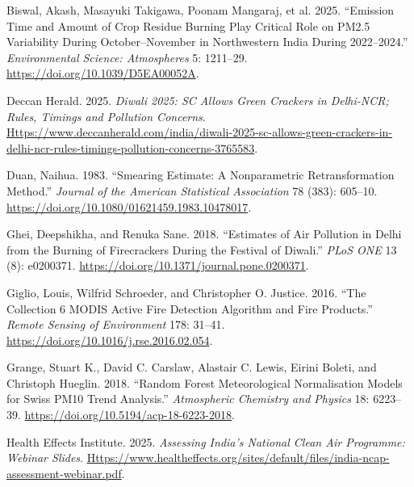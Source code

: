 \documentclass[
  11pt,
]{article}
\newlength{\cslhangindent}
\newenvironment{CSLReferences}[2] %
 {\begin{list}{}{%
  \setlength{\itemindent}{0pt}
  \setlength{\leftmargin}{0pt}
  \setlength{\parsep}{0pt}
  \ifodd #1
   \setlength{\leftmargin}{\cslhangindent}
   \setlength{\itemindent}{-1\cslhangindent}
  \fi
  \setlength{\itemsep}{#2\baselineskip}}}
 {\end{list}}
\begin{document}
\protect{}\label{refs}
\begin{CSLReferences}{1}{1}
Biswal, Akash, Masayuki Takigawa, Poonam Mangaraj, et al. 2025.
{``Emission Time and Amount of Crop Residue Burning Play Critical Role
on {PM2.5} Variability During {October--November} in Northwestern
{India} During 2022--2024.''} \emph{Environmental Science: Atmospheres}
5: 1211--29. \url{https://doi.org/10.1039/D5EA00052A}.

Deccan Herald. 2025. \emph{Diwali 2025: {SC} Allows Green Crackers in
{Delhi-NCR}; Rules, Timings and Pollution Concerns}.
\href{https://www.deccanherald.com/india/diwali-2025-sc-allows-green-crackers-in-delhi-ncr-rules-timings-pollution-concerns-3765583}{Https://www.deccanherald.com/india/diwali-2025-sc-allows-green-crackers-in-delhi-ncr-rules-timings-pollution-concerns-3765583}.

Duan, Naihua. 1983. {``Smearing Estimate: A Nonparametric
Retransformation Method.''} \emph{Journal of the American Statistical
Association} 78 (383): 605--10.
\url{https://doi.org/10.1080/01621459.1983.10478017}.

Ghei, Deepshikha, and Renuka Sane. 2018. {``Estimates of Air Pollution
in {Delhi} from the Burning of Firecrackers During the Festival of
{Diwali}.''} \emph{PLoS ONE} 13 (8): e0200371.
\url{https://doi.org/10.1371/journal.pone.0200371}.

Giglio, Louis, Wilfrid Schroeder, and Christopher O. Justice. 2016.
{``The Collection 6 {MODIS} Active Fire Detection Algorithm and Fire
Products.''} \emph{Remote Sensing of Environment} 178: 31--41.
\url{https://doi.org/10.1016/j.rse.2016.02.054}.

Grange, Stuart K., David C. Carslaw, Alastair C. Lewis, Eirini Boleti,
and Christoph Hueglin. 2018. {``Random Forest Meteorological
Normalisation Models for {Swiss} {PM10} Trend Analysis.''}
\emph{Atmospheric Chemistry and Physics} 18: 6223--39.
\url{https://doi.org/10.5194/acp-18-6223-2018}.

Health Effects Institute. 2025. \emph{Assessing {India}'s {National
Clean Air Programme}: Webinar Slides}.
\href{https://www.healtheffects.org/sites/default/files/india-ncap-assessment-webinar.pdf}{Https://www.healtheffects.org/sites/default/files/india-ncap-assessment-webinar.pdf}.


\end{CSLReferences}
\end{document}
